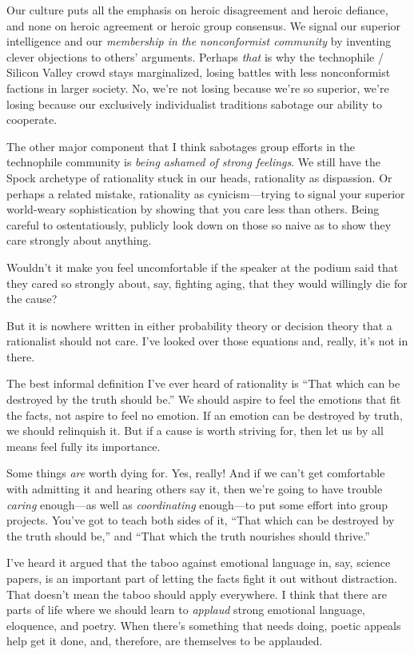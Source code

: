 {
 Our culture puts all the emphasis on heroic disagreement and
heroic defiance, and none on heroic agreement or heroic group
consensus. We signal our superior intelligence and our
\textit{membership in the nonconformist community} by inventing clever
objections to others' arguments. Perhaps \textit{that}
is why the technophile / Silicon Valley crowd stays marginalized,
losing battles with less nonconformist factions in larger society. No,
we're not losing because we're so
superior, we're losing because our exclusively
individualist traditions sabotage our ability to cooperate.}

{
 The other major component that I think sabotages group efforts in
the technophile community is \textit{being ashamed of strong feelings}.
We still have the Spock archetype of rationality stuck in our heads,
rationality as dispassion. Or perhaps a related mistake, rationality as
cynicism---trying to signal your superior world-weary sophistication by
showing that you care less than others. Being careful to
ostentatiously, publicly look down on those so naive as to show they
care strongly about anything.}

{
 Wouldn't it make you feel uncomfortable if the
speaker at the podium said that they cared so strongly about, say,
fighting aging, that they would willingly die for the cause?}

{
 But it is nowhere written in either probability theory or decision
theory that a rationalist should not care. I've looked
over those equations and, really, it's not in there.}

{
 The best informal definition I've ever heard of
rationality is ``That which can be destroyed by the
truth should be.'' We should aspire to feel the
emotions that fit the facts, not aspire to feel no emotion. If an
emotion can be destroyed by truth, we should relinquish it. But if a
cause is worth striving for, then let us by all means feel fully its
importance.}

{
 Some things \textit{are} worth dying for. Yes, really! And if we
can't get comfortable with admitting it and hearing
others say it, then we're going to have trouble
\textit{caring} enough---as well as \textit{coordinating} enough---to
put some effort into group projects. You've got to
teach both sides of it, ``That which can be destroyed
by the truth should be,'' and ``That
which the truth nourishes should thrive.''}

{
 I've heard it argued that the taboo against
emotional language in, say, science papers, is an important part of
letting the facts fight it out without distraction. That
doesn't mean the taboo should apply everywhere. I think
that there are parts of life where we should learn to \textit{applaud}
strong emotional language, eloquence, and poetry. When
there's something that needs doing, poetic appeals help
get it done, and, therefore, are themselves to be applauded.}

